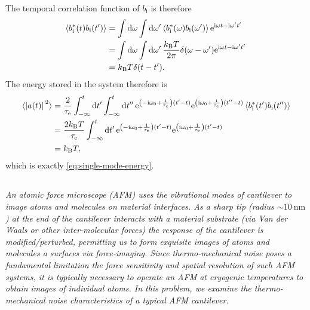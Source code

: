 \documentclass[hyperref, a4paper]{article}
\newcommand*{\ii}{\mathrm{i}}
\newcommand*{\ee}{\mathrm{e}}
\newcommand*{\kB}{k_{\text{B}}}
\newcommand*{\taue}{\tau_{\text{e}}}
\newcommand*{\bi}{b_{\text{i}}}
\begin{document}
The temporal correlation function of $\bi$ is therefore
\begin{equation}
    \begin{aligned}
        \expval{\bi^*(t) \bi(t')} &= \int \dd{\omega} \int \dd{\omega'}
        \expval{\bi^*(\omega) \bi(\omega')} \ee^{\ii \omega t - \ii \omega' t'} \\
        &= \int \dd{\omega} \int \dd{\omega'}
        \frac{\kB T}{2\pi} \delta(\omega - \omega') \ee^{\ii \omega t - \ii \omega' t'} \\
        &= \kB T \delta(t - t').
    \end{aligned}
\end{equation} 
The energy stored in the system therefore is 
\begin{equation}
    \begin{aligned}
        \expval*{\abs*{a(t)}^2} &= \frac{2}{\taue} \int_{-\infty}^{t} \dd{t'} \int_{-\infty}^{t} \dd{t''}
        \ee^{\left( - \ii \omega_0 + \frac{1}{\taue} \right) (t' - t)} \ee^{\left( \ii \omega_0 + \frac{1}{\taue} \right) (t'' - t)}
        \expval*{\bi^*(t') \bi(t'')}  \\
        &= \frac{2\kB T}{\taue} \int_{-\infty}^{t} \dd{t'} \ee^{\left(- \ii \omega_0 + \frac{1}{\taue}\right) (t' - t)} \ee^{\left( \ii \omega_0 + \frac{1}{\taue} \right) (t' - t)} \\
        &= \kB T,
    \end{aligned}
\end{equation} 
which is exactly \eqref{eq:single-mode-energy}.

\subsection{}

\textit{An atomic force microscope (AFM) uses the vibrational modes of cantilever to image atoms and molecules on material interfaces. As a sharp tip (radius $\sim 10 \mathrm{~nm}$ ) at the end of the cantilever interacts with a material substrate (via Van der Waals or other inter-molecular forces) the response of the cantilever is modified/perturbed, permitting us to form exquisite images of atoms and molecules a surfaces via force-imaging. Since thermo-mechanical noise poses a fundamental limitation the force sensitivity and spatial resolution of such AFM systems, it is typically necessary to operate an AFM at cryogenic temperatures to obtain images of individual atoms. In this problem, we examine the thermo-mechanical noise characteristics of a typical AFM cantilever.}
\end{document}
